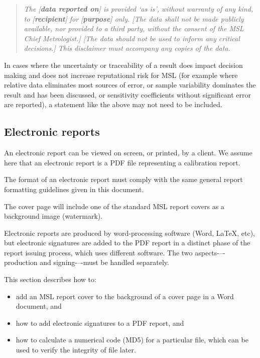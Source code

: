 \begin{quote}
\textit{The [\textbf{data reported on}] is provided `as is', without warranty of any kind, to [\textbf{recipient}] for [\textbf{purpose}] only. [{The data shall not be made publicly available, nor provided to a third party, without the consent of the MSL Chief Metrologist.}] [The data should not be used to inform any critical decisions.] This disclaimer must accompany any copies of the data.}
\end{quote}

In cases where the uncertainty or traceability of a result does impact decision making and does not increase reputational risk for MSL (for example where relative data eliminates most sources of error, or sample variability dominates the result and has been discussed, or sensitivity coefficients without significant error are reported), a statement like the above may not need to be included.

\subsection{Electronic reports}
 \label{ss:electronic_reports}
 
An electronic report can be viewed on screen, or printed, by a client. We assume here that an electronic report is a PDF file representing a calibration report. 

The format of an electronic report must comply with the same general report formatting guidelines given in this document. 

The cover page will include one of the standard MSL report covers as a background image (watermark).

Electronic reports are produced by word-processing software (Word, LaTeX, etc), but electronic signatures are added to the PDF report in a distinct phase of the report issuing process, which uses different software. The two aspects-–-production and signing-–-must be handled separately. 
 
This section describes how to: 
\begin{itemize}
\item	add an MSL report cover to the background of a cover page in a Word document, and
\item	how to add electronic signatures to a PDF report, and 
\item	how to calculate a numerical code (MD5) for a particular file, which can be used to verify the integrity of file later.
\end{itemize}

